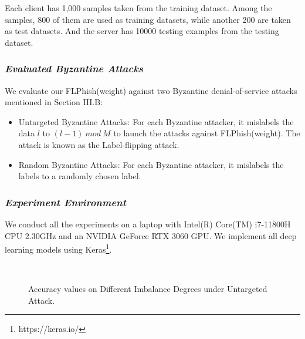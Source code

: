 \documentclass[journal]{IEEEtran}
\begin{document}
  \par Each client has 1,000 samples taken from the training dataset. Among the samples, 800 of them are used as training datasets, while another 200 are taken as test datasets. And the server has 10000 testing examples from the testing dataset. 
  \subsubsection{\textit{Evaluated Byzantine Attacks}} We evaluate our FLPhish(weight) against two Byzantine denial-of-service attacks mentioned in Section III.B:
  \begin{itemize}
    \item Untargeted Byzantine Attacks: For each Byzantine attacker, it mislabels the data $l$ to $(l-1)\ mod\ M$ to launch the attacks against FLPhish(weight). The attack is known as the Label-flipping attack. 
    \item Random Byzantine Attacks: For each Byzantine attacker, it mislabels the labels to a randomly chosen label.
    \end{itemize}

  
  \subsubsection{{\textit{Experiment Environment}}} We conduct all the experiments on a laptop with Intel(R) Core(TM) i7-11800H CPU 2.30GHz and an NVIDIA GeForce RTX 3060 GPU. We implement all deep learning models using Keras\footnote{https://keras.io/}.



  \begin{figure}[!htp]
    \centering
    \\
    \caption{Accuracy values on Different Imbalance Degrees under Untargeted Attack.}
    \label{fig_table_imbalances_untargeted}
  \end{figure}
\end{document}
